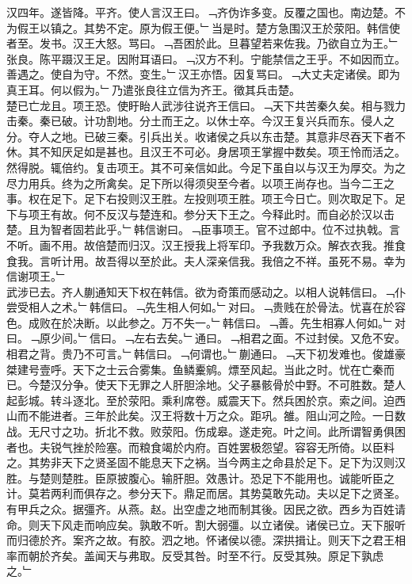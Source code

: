 \documentclass{zhvt-classic}
\begin{document}
\hspace*{2em}汉四年。遂皆降。平齐。使人言汉王曰。﹁齐伪诈多变。反覆之国也。南边楚。不为假王以镇之。其势不定。原为假王便。﹂当是时。楚方急围汉王於荥阳。韩信使者至。发书。汉王大怒。骂曰。﹁吾困於此。旦暮望若来佐我。乃欲自立为王。﹂张良。陈平蹑汉王足。因附耳语曰。﹁汉方不利。宁能禁信之王乎。不如因而立。善遇之。使自为守。不然。变生。﹂汉王亦悟。因复骂曰。﹁大丈夫定诸侯。即为真王耳。何以假为。﹂乃遣张良往立信为齐王。徵其兵击楚。\\
\hspace*{2em}楚已亡龙且。项王恐。使盱眙人武涉往说齐王信曰。﹁天下共苦秦久矣。相与戮力击秦。秦已破。计功割地。分土而王之。以休士卒。今汉王复兴兵而东。侵人之分。夺人之地。已破三秦。引兵出关。收诸侯之兵以东击楚。其意非尽吞天下者不休。其不知厌足如是甚也。且汉王不可必。身居项王掌握中数矣。项王怜而活之。然得脱。辄倍约。复击项王。其不可亲信如此。今足下虽自以与汉王为厚交。为之尽力用兵。终为之所禽矣。足下所以得须臾至今者。以项王尚存也。当今二王之事。权在足下。足下右投则汉王胜。左投则项王胜。项王今日亡。则次取足下。足下与项王有故。何不反汉与楚连和。参分天下王之。今释此时。而自必於汉以击楚。且为智者固若此乎。﹂韩信谢曰。﹁臣事项王。官不过郎中。位不过执戟。言不听。画不用。故倍楚而归汉。汉王授我上将军印。予我数万众。解衣衣我。推食食我。言听计用。故吾得以至於此。夫人深亲信我。我倍之不祥。虽死不易。幸为信谢项王。﹂\\
\hspace*{2em}武涉已去。齐人蒯通知天下权在韩信。欲为奇策而感动之。以相人说韩信曰。﹁仆尝受相人之术。﹂韩信曰。﹁先生相人何如。﹂对曰。﹁贵贱在於骨法。忧喜在於容色。成败在於决断。以此参之。万不失一。﹂韩信曰。﹁善。先生相寡人何如。﹂对曰。﹁原少间。﹂信曰。﹁左右去矣。﹂通曰。﹁相君之面。不过封侯。又危不安。相君之背。贵乃不可言。﹂韩信曰。﹁何谓也。﹂蒯通曰。﹁天下初发难也。俊雄豪桀建号壹呼。天下之士云合雾集。鱼鳞櫜鹓。熛至风起。当此之时。忧在亡秦而已。今楚汉分争。使天下无罪之人肝胆涂地。父子暴骸骨於中野。不可胜数。楚人起彭城。转斗逐北。至於荥阳。乘利席卷。威震天下。然兵困於京。索之间。迫西山而不能进者。三年於此矣。汉王将数十万之众。距巩。雒。阻山河之险。一日数战。无尺寸之功。折北不救。败荥阳。伤成皋。遂走宛。叶之间。此所谓智勇俱困者也。夫锐气挫於险塞。而粮食竭於内府。百姓罢极怨望。容容无所倚。以臣料之。其势非天下之贤圣固不能息天下之祸。当今两主之命县於足下。足下为汉则汉胜。与楚则楚胜。臣原披腹心。输肝胆。效愚计。恐足下不能用也。诚能听臣之计。莫若两利而俱存之。参分天下。鼎足而居。其势莫敢先动。夫以足下之贤圣。有甲兵之众。据彊齐。从燕。赵。出空虚之地而制其後。因民之欲。西乡为百姓请命。则天下风走而响应矣。孰敢不听。割大弱彊。以立诸侯。诸侯已立。天下服听而归德於齐。案齐之故。有胶。泗之地。怀诸侯以德。深拱揖让。则天下之君王相率而朝於齐矣。盖闻天与弗取。反受其咎。时至不行。反受其殃。原足下孰虑之。﹂\\
\end{document}
